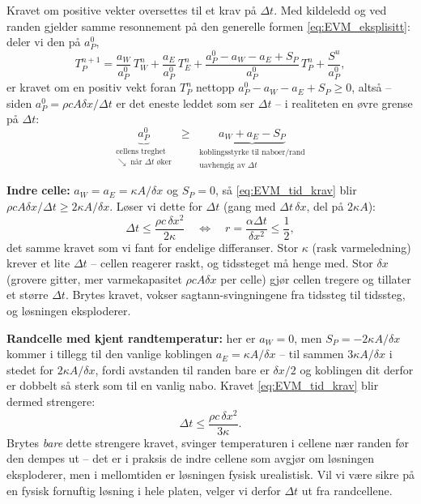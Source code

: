 Kravet om positive vekter oversettes til et krav på $\Delta t$. Med kildeledd og ved randen gjelder samme resonnement på den generelle formen \eqref{eq:EVM_eksplisitt}: deler vi den på $a_P^0$,
\[
T_P^{n+1} = \frac{a_W}{a_P^0}\,T_W^n + \frac{a_E}{a_P^0}\,T_E^n + \frac{a_P^0 - a_W - a_E + S_P}{a_P^0}\,T_P^n + \frac{S^u}{a_P^0},
\]
er kravet om en positiv vekt foran $T_P^n$ nettopp $a_P^0 - a_W - a_E + S_P \ge 0$, altså -- siden $a_P^0=\rho c A\delta x/\Delta t$ er det eneste leddet som ser $\Delta t$ -- i realiteten en øvre grense på $\Delta t$:
\begin{equation}\label{eq:EVM_tid_krav}
\underbrace{a_P^0}_{\substack{\text{cellens treghet}\\[-2pt]\scriptstyle\searrow\;\text{når }\Delta t\text{ øker}}} \;\ge\; \underbrace{a_W+a_E-S_P}_{\substack{\text{koblingsstyrke til naboer/rand}\\[-2pt]\scriptstyle\text{uavhengig av }\Delta t}}
\end{equation}

\textbf{Indre celle:} $a_W=a_E=\kappa A/\delta x$ og $S_P=0$, så \eqref{eq:EVM_tid_krav} blir $\rho c A\delta x/\Delta t \ge 2\kappa A/\delta x$. Løser vi dette for $\Delta t$ (gang med $\Delta t\,\delta x$, del på $2\kappa A$):
\[
\Delta t \le \frac{\rho c\,\delta x^2}{2\kappa} \quad\Longleftrightarrow\quad r = \frac{\alpha\Delta t}{\delta x^2}\le \frac12,
\]
det samme kravet som vi fant for endelige differanser. Stor $\kappa$ (rask varmeledning) krever et lite $\Delta t$ -- cellen reagerer raskt, og tidssteget må henge med. Stor $\delta x$ (grovere gitter, mer varmekapasitet $\rho cA\delta x$ per celle) gjør cellen tregere og tillater et større $\Delta t$. Brytes kravet, vokser sagtann-svingningene fra tidssteg til tidssteg, og løsningen eksploderer.

\textbf{Randcelle med kjent randtemperatur:} her er $a_W=0$, men $S_P=-2\kappa A/\delta x$ kommer i tillegg til den vanlige koblingen $a_E=\kappa A/\delta x$ -- til sammen $3\kappa A/\delta x$ i stedet for $2\kappa A/\delta x$, fordi avstanden til randen bare er $\delta x/2$ og koblingen dit derfor er dobbelt så sterk som til en vanlig nabo. Kravet \eqref{eq:EVM_tid_krav} blir dermed strengere:
\[
\Delta t \le \frac{\rho c\,\delta x^2}{3\kappa}.
\]
Brytes \emph{bare} dette strengere kravet, svinger temperaturen i cellene nær randen før den dempes ut -- det er i praksis de indre cellene som avgjør om løsningen eksploderer, men i mellomtiden er løsningen fysisk urealistisk. Vil vi være sikre på en fysisk fornuftig løsning i hele platen, velger vi derfor $\Delta t$ ut fra randcellene.

